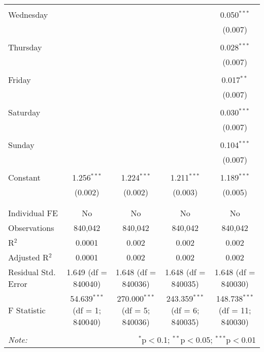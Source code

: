 \documentclass[
]{article}
\begin{document}
\begin{table}[!htbp]
{\begin{tabular}{@{\extracolsep{5pt}}lcccc}
  & & & & \\ 
 Wednesday &  &  &  & 0.050$^{***}$ \\ 
  &  &  &  & (0.007) \\ 
  & & & & \\ 
 Thursday &  &  &  & 0.028$^{***}$ \\ 
  &  &  &  & (0.007) \\ 
  & & & & \\ 
 Friday &  &  &  & 0.017$^{**}$ \\ 
  &  &  &  & (0.007) \\ 
  & & & & \\ 
 Saturday &  &  &  & 0.030$^{***}$ \\ 
  &  &  &  & (0.007) \\ 
  & & & & \\ 
 Sunday &  &  &  & 0.104$^{***}$ \\ 
  &  &  &  & (0.007) \\ 
  & & & & \\ 
 Constant & 1.256$^{***}$ & 1.224$^{***}$ & 1.211$^{***}$ & 1.189$^{***}$ \\ 
  & (0.002) & (0.002) & (0.003) & (0.005) \\ 
  & & & & \\ 
\hline \\[-1.8ex] 
Individual FE & No & No & No & No \\ 
Observations & 840,042 & 840,042 & 840,042 & 840,042 \\ 
R$^{2}$ & 0.0001 & 0.002 & 0.002 & 0.002 \\ 
Adjusted R$^{2}$ & 0.0001 & 0.002 & 0.002 & 0.002 \\ 
Residual Std. Error & 1.649 (df = 840040) & 1.648 (df = 840036) & 1.648 (df = 840035) & 1.648 (df = 840030) \\ 
F Statistic & 54.639$^{***}$ (df = 1; 840040) & 270.000$^{***}$ (df = 5; 840036) & 243.359$^{***}$ (df = 6; 840035) & 148.738$^{***}$ (df = 11; 840030) \\ 
\hline 
\hline \\[-1.8ex] 
\textit{Note:}  & \multicolumn{4}{r}{$^{*}$p$<$0.1; $^{**}$p$<$0.05; $^{***}$p$<$0.01} \\ 
\end{tabular}
} 
\end{table} 
\newpage
\end{document}
